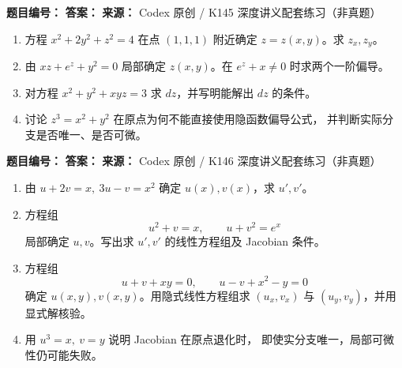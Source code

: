 \begin{problemBox}
\begin{problemMeta}
\textbf{题目编号：}  \quad
\textbf{答案：}  \quad
\textbf{来源：} Codex 原创 / K145 深度讲义配套练习（非真题）
\end{problemMeta}
\begin{enumerate}
\item[\textbf{A}] 方程 \(x^2+2y^2+z^2=4\) 在点 \((1,1,1)\) 附近确定
\(z=z(x,y)\)。求 \(z_x,z_y\)。
\item[\textbf{B}] 由 \(xz+e^z+y^2=0\) 局部确定 \(z(x,y)\)。在
\(e^z+x\ne0\) 时求两个一阶偏导。
\item[\textbf{C}] 对方程 \(x^2+y^2+xyz=3\) 求 \(dz\)，并写明能解出
\(dz\) 的条件。
\item[\textbf{M}] 讨论 \(z^3=x^2+y^2\) 在原点为何不能直接使用隐函数偏导公式，
并判断实际分支是否唯一、是否可微。
\end{enumerate}
\end{problemBox}

\begin{problemBox}
\begin{problemMeta}
\textbf{题目编号：}  \quad
\textbf{答案：}  \quad
\textbf{来源：} Codex 原创 / K146 深度讲义配套练习（非真题）
\end{problemMeta}
\begin{enumerate}
\item[\textbf{A}] 由 \(u+2v=x,\ 3u-v=x^2\) 确定 \(u(x),v(x)\)，求 \(u',v'\)。
\item[\textbf{B}] 方程组
\[
u^2+v=x,\qquad u+v^2=e^x
\]
局部确定 \(u,v\)。写出求 \(u',v'\) 的线性方程组及 Jacobian 条件。
\item[\textbf{C}] 方程组
\[
u+v+xy=0,\qquad u-v+x^2-y=0
\]
确定 \(u(x,y),v(x,y)\)。用隐式线性方程组求
\((u_x,v_x)\) 与 \((u_y,v_y)\)，并用显式解核验。
\item[\textbf{M}] 用 \(u^3=x,\ v=y\) 说明 Jacobian 在原点退化时，
即使实分支唯一，局部可微性仍可能失败。
\end{enumerate}
\end{problemBox}

